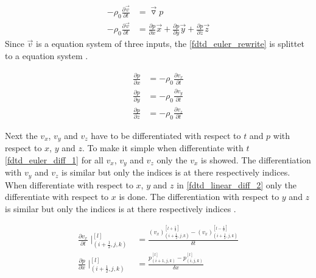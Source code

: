 \begin{subequations}\label{fdtd_euler_rewrite}
\begin{alignat}{2}
-\rho_0 \frac{\partial \vec{v}}{\partial t} &=\vec{\triangledown }p \label{fdtd_euler_rewrite_1}\\
-\rho_0 \frac{\partial \vec{v}}{\partial t} &=\frac{\partial p}{\partial x}\vec{x}+\frac{\partial p}{\partial y}\vec{y}+\frac{\partial p}{\partial z}\vec{z} \label{fdtd_euler_rewrite_2}
\end{alignat}
\end{subequations}
Since $\vec{v}$ is a equation system of three inputs, the \autoref{fdtd_euler_rewrite} is splittet to a equation system \citep{Sakuma2014}.

\begin{subequations}\label{fdtd_euler_rewrite_system}
\begin{alignat}{2}
\frac{\partial p}{\partial x} &=-\rho_0 \frac{\partial v_x}{\partial t} \label{fdtd_euler_rewrite_system_1}\\
\frac{\partial p}{\partial y} &=-\rho_0 \frac{\partial v_y}{\partial t} \label{fdtd_euler_rewrite_system_2}\\
\frac{\partial p}{\partial z} &=-\rho_0 \frac{\partial v_z}{\partial t} \label{fdtd_euler_rewrite_system_2}
\end{alignat}
\end{subequations}


Next the $v_x$, $v_y$ and $v_z$ have to be differentiated with respect to $t$ and $p$ with respect to $x$, $y$ and $z$. To make it simple when differentiate with $t$ \autoref{fdtd_euler_diff_1} for all $v_x$, $v_y$ and $v_z$ only the $v_x$ is showed. The differentiation with $v_y$ and $v_z$ is similar but only the indices is at there respectively indices. When differentiate with respect to $x$, $y$ and $z$ in \autoref{fdtd_linear_diff_2} only the differentiate with respect to $x$ is done. The differentiation with respect to $y$ and $z$ is similar but only the indices is at there respectively indices \citep{Sakuma2014}.



\begin{subequations}\label{fdtd_euler_diff}
\begin{alignat}{2}
\frac{\partial v_x}{\partial t}\mid _{(i+\frac{1}{2},j,k)}^{[l]} &= \frac{(v_x)_{(i+\frac{1}{2},j,k)}^{[l+\frac{1}{2}]} -(v_x)_{(i+\frac{1}{2},j,k)}^{[l-\frac{1}{2}]}}{\delta t} \label{fdtd_euler_diff_1} \\
\frac{\partial p}{\partial x}\mid _{(i+\frac{1}{2},j,k)}^{[l]} &= \frac{p_{(i+1,j,k)}^{[l]} -p_{(i,j,k)}^{[l]}}{\delta x}  \label{fdtd_linear_diff_2}
\end{alignat}
\end{subequations}

